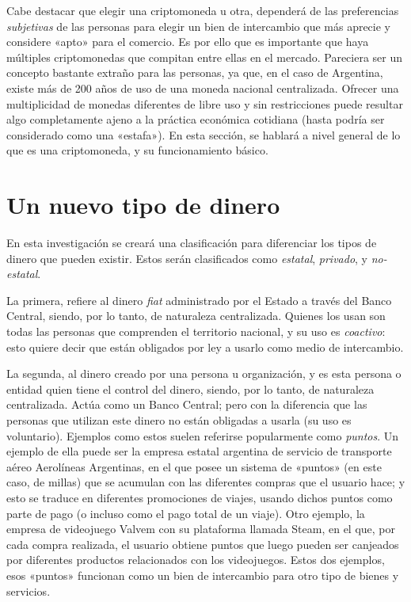 \documentclass[12pt,a4paper,twoside]{book}
\begin{document}
Cabe destacar que elegir una criptomoneda u otra, dependerá de las preferencias \textit{subjetivas} de las personas para elegir un bien de intercambio que más aprecie y considere «apto» para el comercio. Es por ello que es importante que haya múltiples criptomonedas que compitan entre ellas en el mercado. Pareciera ser un concepto bastante extraño para las personas, ya que, en el caso de Argentina, existe más de 200 años de uso de una moneda nacional centralizada. Ofrecer una multiplicidad de monedas diferentes de libre uso y sin restricciones puede resultar algo completamente ajeno a la práctica económica cotidiana (hasta podría ser considerado como una «estafa»). En esta sección, se hablará a nivel general de lo que es una criptomoneda, y su funcionamiento básico.

\section{Un nuevo tipo de dinero}
En esta investigación se creará una clasificación para diferenciar los tipos de dinero que pueden existir. Estos serán clasificados como \textit{estatal}, \textit{privado}, y \textit{no-estatal}.

La primera, refiere al dinero \textit{fiat} administrado por el Estado a través del Banco Central, siendo, por lo tanto, de naturaleza centralizada. Quienes los usan son todas las personas que comprenden el territorio nacional, y su uso es \textit{coactivo}: esto quiere decir que están obligados por ley a usarlo como medio de intercambio.

La segunda, al dinero creado por una persona u organización, y es esta persona o entidad quien tiene el control del dinero, siendo, por lo tanto, de naturaleza centralizada. Actúa como un Banco Central; pero con la diferencia que las personas que utilizan este dinero no están obligadas a usarla (su uso es voluntario). Ejemplos como estos suelen referirse popularmente como \textit{puntos}. Un ejemplo de ella puede ser la empresa estatal argentina de servicio de transporte aéreo Aerolíneas Argentinas, en el que posee un sistema de «puntos» (en este caso, de millas) que se acumulan con las diferentes compras que el usuario hace; y esto se traduce en diferentes promociones de viajes, usando dichos puntos como parte de pago (o incluso como el pago total de un viaje). Otro ejemplo, la empresa de videojuego Valvem con su plataforma llamada Steam, en el que, por cada compra realizada, el usuario obtiene puntos que luego pueden ser canjeados por diferentes productos relacionados con los videojuegos. Estos dos ejemplos, esos «puntos» funcionan como un bien de intercambio para otro tipo de bienes y servicios.
\end{document}
